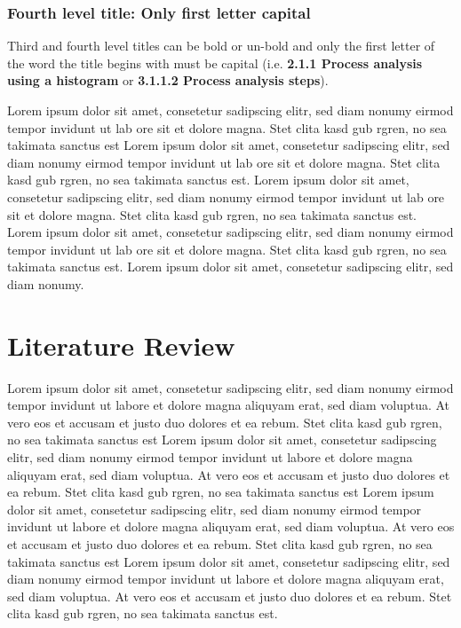 \subsubsection{Fourth level title: Only first letter capital}

Third and fourth level titles can be bold or un-bold and only the first letter of the word the title begins with must be capital (i.e. \textbf{2.1.1 Process analysis using a histogram} or \textbf{3.1.1.2 Process analysis steps}).


Lorem ipsum dolor sit amet, consetetur sadipscing elitr, sed diam nonumy eirmod tempor invidunt ut lab ore sit et dolore magna. Stet clita kasd gub rgren, no sea takimata sanctus est Lorem ipsum dolor sit amet, consetetur sadipscing elitr, sed diam nonumy eirmod tempor invidunt ut lab ore sit et dolore magna. Stet clita kasd gub rgren, no sea takimata sanctus est. Lorem ipsum dolor sit amet, consetetur sadipscing elitr, sed diam nonumy eirmod tempor invidunt ut lab ore sit et dolore magna. Stet clita kasd gub rgren, no sea takimata sanctus est. Lorem ipsum dolor sit amet, consetetur sadipscing elitr, sed diam nonumy eirmod tempor invidunt ut lab ore sit et dolore magna. Stet clita kasd gub rgren, no sea takimata sanctus est. Lorem ipsum dolor sit amet, consetetur sadipscing elitr, sed diam nonumy.

\section{Literature Review}\label{literaturereview}

Lorem ipsum dolor sit amet, consetetur sadipscing elitr, sed diam nonumy eirmod tempor invidunt ut labore et dolore magna aliquyam erat, sed diam voluptua. At vero eos et accusam et justo duo dolores et ea rebum. Stet clita kasd gub rgren, no sea takimata sanctus est Lorem ipsum dolor sit amet, consetetur sadipscing elitr, sed diam nonumy eirmod tempor invidunt ut labore et dolore magna aliquyam erat, sed diam voluptua. At vero eos et accusam et justo duo dolores et ea rebum. Stet clita kasd gub rgren, no sea takimata sanctus est Lorem ipsum dolor sit amet, consetetur sadipscing elitr, sed diam nonumy eirmod tempor invidunt ut labore et dolore magna aliquyam erat, sed diam voluptua. At vero eos et accusam et justo duo dolores et ea rebum. Stet clita kasd gub rgren, no sea takimata sanctus est Lorem ipsum dolor sit amet, consetetur sadipscing elitr, sed diam nonumy eirmod tempor invidunt ut labore et dolore magna aliquyam erat, sed diam voluptua. At vero eos et accusam et justo duo dolores et ea rebum. Stet clita kasd gub rgren, no sea takimata sanctus est.

